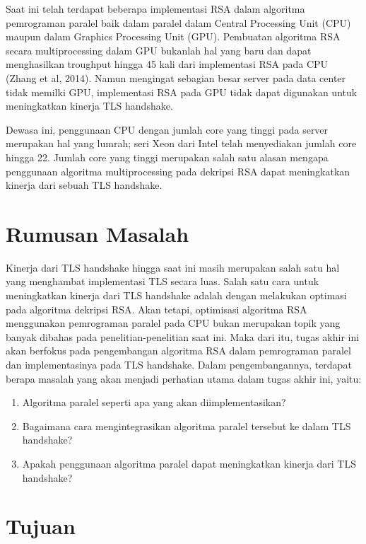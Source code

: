 Saat ini telah terdapat beberapa implementasi RSA dalam algoritma pemrograman paralel baik dalam paralel dalam Central Processing Unit (CPU) maupun dalam Graphics Processing Unit (GPU). Pembuatan algoritma RSA secara multiprocessing dalam GPU bukanlah hal yang baru dan dapat menghasilkan troughput hingga 45 kali dari implementasi RSA pada CPU (Zhang et al, 2014). Namun mengingat sebagian besar server pada data center tidak memilki GPU, implementasi RSA pada GPU tidak dapat digunakan untuk meningkatkan kinerja TLS handshake.

Dewasa ini, penggunaan CPU dengan jumlah core yang tinggi pada server merupakan hal yang lumrah; seri Xeon dari Intel telah menyediakan jumlah core hingga 22. Jumlah core yang tinggi merupakan salah satu alasan mengapa penggunaan algoritma multiprocessing pada dekripsi RSA dapat meningkatkan kinerja dari sebuah TLS handshake.


\section{Rumusan Masalah}

Kinerja dari TLS handshake hingga saat ini masih merupakan salah satu hal yang menghambat implementasi TLS secara luas. Salah satu cara untuk meningkatkan kinerja dari TLS handshake adalah dengan melakukan optimasi pada algoritma dekripsi RSA. Akan tetapi, optimisasi algoritma RSA menggunakan pemrograman paralel pada CPU bukan merupakan topik yang banyak dibahas pada penelitian-penelitian saat ini. Maka dari itu, tugas akhir ini akan berfokus pada pengembangan algoritma RSA dalam pemrograman paralel dan implementasinya pada TLS handshake. Dalam pengembangannya, terdapat berapa masalah yang akan menjadi perhatian utama dalam tugas akhir ini, yaitu:

\begin{enumerate}
  \item Algoritma paralel seperti apa yang akan diimplementasikan?
  \item Bagaimana cara mengintegrasikan algoritma paralel tersebut ke dalam TLS handshake?
  \item Apakah penggunaan algoritma paralel dapat meningkatkan kinerja dari TLS handshake?
\end{enumerate}

\section{Tujuan}

